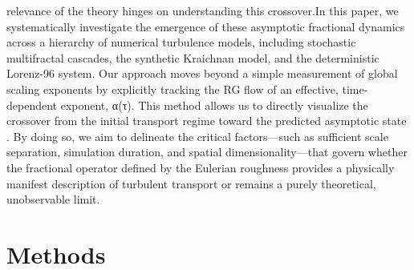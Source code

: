 \documentclass[]{article}
\begin{document}
relevance of the theory hinges on understanding this crossover.In this paper, we systematically investigate the emergence of these asymptotic fractional dynamics  \citep{edelman2022cyclesasymptoticallystablechaotic} across a hierarchy of numerical turbulence models, including stochastic multifractal cascades, the synthetic Kraichnan model, and the deterministic Lorenz-96 system. Our approach moves beyond a simple measurement of global scaling exponents by explicitly tracking the RG flow of an effective, time-dependent exponent, α(τ). This method allows us to directly visualize the crossover from the initial transport regime toward the predicted asymptotic state  \citep{majdoub2025longtimeasymptoticssubordinatedfractional}. By doing so, we aim to delineate the critical factors—such as sufficient scale separation, simulation duration, and spatial dimensionality—that govern whether the fractional operator defined by the Eulerian roughness provides a physically manifest description of turbulent transport or remains a purely theoretical, unobservable limit.

\section{Methods}
\label{sec:methods}
\end{document}

